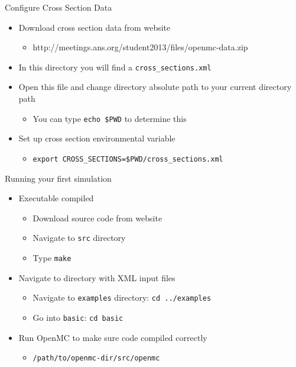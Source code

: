 \documentclass[serif]{beamer}
\begin{document}
\begin{frame}{Configure Cross Section Data}

  \begin{itemize}
    \item Download cross section data from website\vfill
      \begin{itemize}
         \item http://meetings.ans.org/student2013/files/openmc-data.zip
      \end{itemize}\vfill
    \item In this directory you will find a \texttt{cross\_sections.xml}\vfill
    \item Open this file and change directory absolute path to your current directory path
      \begin{itemize}
         \item You can type \texttt{echo \$PWD} to determine this
      \end{itemize}\vfill
    \item Set up cross section environmental variable
      \begin{itemize}
         \item \texttt{export CROSS\_SECTIONS=\$PWD/cross\_sections.xml}
      \end{itemize}
  
  \end{itemize}
\end{frame}


\begin{frame}{Running your first simulation}
  \begin{itemize}
  \item<1-> Executable compiled
    \begin{itemize}
      \item Download source code from website
      \item Navigate to \texttt{src} directory
      \item Type \texttt{make}
    \end{itemize}\vfill
  \item<1-> Navigate to directory with XML input files
    \begin{itemize}
      \item Navigate to \texttt{examples} directory: \texttt{cd ../examples}
      \item Go into \texttt{basic}: \texttt{cd basic}
    \end{itemize}\vfill
  \item<1-> Run OpenMC to make sure code compiled correctly
     \begin{itemize}
       \item \texttt{/path/to/openmc-dir/src/openmc}
     \end{itemize}
  \end{itemize}
\end{frame}
\end{document}
